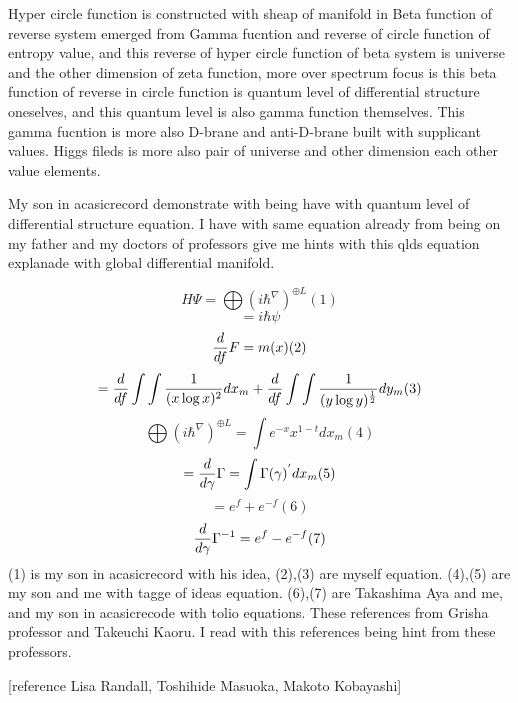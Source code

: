 \documentclass{jsarticle}
\begin{document}
    Hyper circle function is constructed with sheap of manifold in 
    Beta function of reverse system emerged from Gamma fucntion 
    and reverse of circle function of entropy value,
    and this reverse of hyper circle function of beta system
    is universe and the other dimension of zeta function,
    more over spectrum focus is this beta function of reverse in
    circle function is quantum level of differential structure oneselves,
    and this quantum level is also gamma function themselves.
    This gamma fucntion is more also D-brane and anti-D-brane built 
    with supplicant values. Higgs fileds is more also pair of universe and
    other dimension each other value elements. 


    My son in acasicrecord demonstrate with being have with quantum level
    of differential structure equation.
    I have with same equation already from being on 
    my father and my doctors of professors give me hints with 
    this qlds equation explanade with global differential manifold.

    $$ H\Psi = \bigoplus {(i \hbar^{\nabla})}^{\oplus L}  (1)$$
    $$ = i\hbar\psi $$
    $$ {d \over df}F = m(x) (2) $$
    $$ = {d \over df}\int \int{1 \over (x \log x)^2}dx_m
    + {d \over df}\int \int{1 \over (y \log y)^{1 \over 2}}dy_m  (3)$$
    $$  \bigoplus {(i \hbar^{\nabla})}^{\oplus L} = \int e^{-x}x^{1 - t}dx_m 
    (4)$$
    $$ = {d \over d \gamma}\Gamma = \int \Gamma(\gamma)^{'}dx_m (5)$$
    $$ = e^f + e^{-f} (6)$$
    $$ {d \over d \gamma}\Gamma^{-1} = e^{f} - e^{-f} (7)$$
    (1) is my son in acasicrecord with his idea, (2),(3) are myself equation.
    (4),(5) are my son and me with tagge of ideas equation.
    (6),(7) are Takashima Aya and me, and my son in acasicrecode with tolio
    equations.
    These references from Grisha professor and Takeuchi Kaoru.
    I read with this references being hint from these professors.
 
      [reference Lisa Randall, Toshihide Masuoka, Makoto Kobayashi]

 
\end{document}
